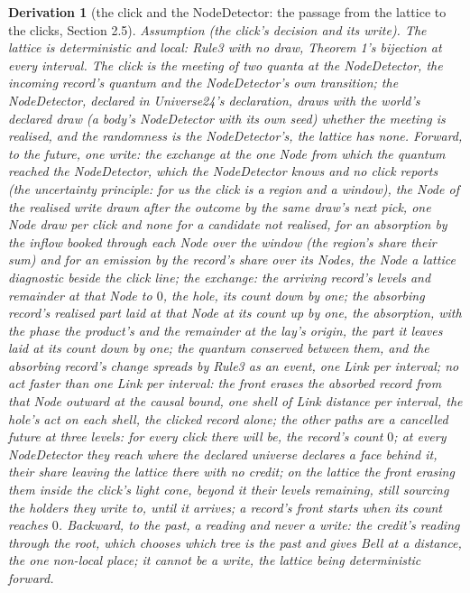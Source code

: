 \documentclass[pdflatex,sn-mathphys-num]{sn-jnl}
\theoremstyle{thmstyleone}
\newtheorem{derivation}{Derivation}
\begin{document}
\begin{derivation}[the click and the NodeDetector: the passage from the lattice to the clicks, Section 2.5]
\emph{Assumption (the click's decision and its write).} The lattice is deterministic and local: Rule3 with no draw, Theorem 1's bijection at every interval. The click is the meeting of two quanta at the NodeDetector, the incoming record's quantum and the NodeDetector's own transition; the NodeDetector, declared in Universe24's declaration, draws with the world's declared draw (a body's NodeDetector with its own seed) whether the meeting is realised, and the randomness is the NodeDetector's, the lattice has none. Forward, to the future, one write: the exchange at the one Node from which the quantum reached the NodeDetector, which the NodeDetector knows and no click reports (the uncertainty principle: for us the click is a region and a window), the Node of the realised write drawn after the outcome by the same draw's next pick, one Node draw per click and none for a candidate not realised, for an absorption by the inflow booked through each Node over the window (the region's share their sum) and for an emission by the record's share over its Nodes, the Node a lattice diagnostic beside the click line; the exchange: the arriving record's levels and remainder at that Node to $0$, the hole, its count down by one; the absorbing record's realised part laid at that Node at its count up by one, the absorption, with the phase the product's and the remainder at the lay's origin, the part it leaves laid at its count down by one; the quantum conserved between them, and the absorbing record's change spreads by Rule3 as an event, one Link per interval; no act faster than one Link per interval: the front erases the absorbed record from that Node outward at the causal bound, one shell of Link distance per interval, the hole's act on each shell, the clicked record alone; the other paths are a cancelled future at three levels: for every click there will be, the record's count $0$; at every NodeDetector they reach where the declared universe declares a face behind it, their share leaving the lattice there with no credit; on the lattice the front erasing them inside the click's light cone, beyond it their levels remaining, still sourcing the holders they write to, until it arrives; a record's front starts when its count reaches $0$. Backward, to the past, a reading and never a write: the credit's reading through the root, which chooses which tree is the past and gives Bell at a distance, the one non-local place; it cannot be a write, the lattice being deterministic forward.


\end{derivation}
\end{document}
